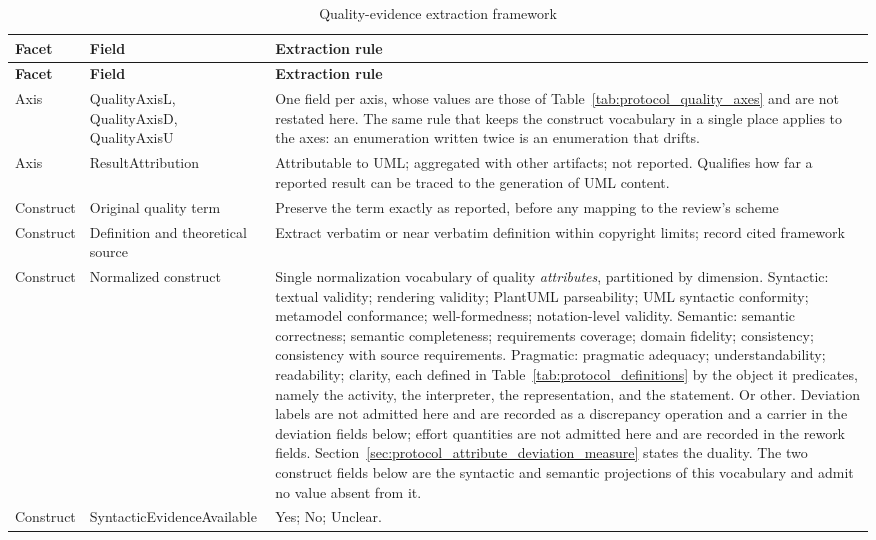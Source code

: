 \begin{longtable}{p{} p{} p{}}
\caption{Quality-evidence extraction framework}
\label{tab:protocol_quality_evidence_extraction}\\
\toprule
\textbf{Facet} & \textbf{Field} & \textbf{Extraction rule} \\
\midrule
\endfirsthead
\toprule
\textbf{Facet} & \textbf{Field} & \textbf{Extraction rule} \\
\midrule
\endhead
Axis & QualityAxisL, QualityAxisD, QualityAxisU & One field per axis, whose values are those of Table~\ref{tab:protocol_quality_axes} and are not restated here. The same rule that keeps the construct vocabulary in a single place applies to the axes: an enumeration written twice is an enumeration that drifts. \\
Axis & ResultAttribution & Attributable to UML; aggregated with other artifacts; not reported. Qualifies how far a reported result can be traced to the generation of UML content. \\
Construct & Original quality term & Preserve the term exactly as reported, before any mapping to the review's scheme \\
Construct & Definition and theoretical source & Extract verbatim or near verbatim definition within copyright limits; record cited framework \\
Construct & Normalized construct & Single normalization vocabulary of quality \textit{attributes}, partitioned by dimension. Syntactic: textual validity; rendering validity; PlantUML parseability; UML syntactic conformity; metamodel conformance; well-formedness; notation-level validity. Semantic: semantic correctness; semantic completeness; requirements coverage; domain fidelity; consistency; consistency with source requirements. Pragmatic: pragmatic adequacy; understandability; readability; clarity, each defined in Table~\ref{tab:protocol_definitions} by the object it predicates, namely the activity, the interpreter, the representation, and the statement. Or other. Deviation labels are not admitted here and are recorded as a discrepancy operation and a carrier in the deviation fields below; effort quantities are not admitted here and are recorded in the rework fields. Section~\ref{sec:protocol_attribute_deviation_measure} states the duality. The two construct fields below are the syntactic and semantic projections of this vocabulary and admit no value absent from it. \\
Construct & SyntacticEvidenceAvailable & Yes; No; Unclear. \\

\end{longtable}
